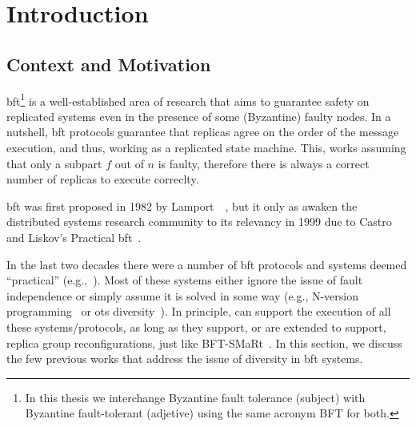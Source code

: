 \chapter{Introduction}
\label{chap:introduction}

\section{Context and Motivation}
\gls{bft}\footnote{In this thesis we interchange Byzantine fault tolerance (subject) with Byzantine fault-tolerant (adjetive) using the same acronym BFT for both.} is a well-established area of research that aims to guarantee safety on replicated systems even in the presence of some (Byzantine) faulty nodes.
In a nutshell, \gls{bft} protocols guarantee that replicas agree on the order of the message execution, and thus, working as a replicated state machine.
This, works assuming that only a subpart $f$ out of $n$ is faulty, therefore there is always a correct number of replicas to execute correclty.


\gls{bft} was first proposed in 1982 by Lamport~\etal{}~\cite{Lamport:1982}, but it only as awaken the distributed systems research community to its relevancy in 1999 due to Castro and Liskov's Practical \gls{bft}~\cite{Castro:1999}. 

In the last two decades there were a number of \gls{bft} protocols and systems deemed ``practical'' (e.g.,~\cite{Castro:2002,Kotla:2010,Veronese:2013,Aublin:2015,Behl:2015,Behl:2017,Liu:2016,Yin:2003}).
Most of these systems either ignore the issue of fault independence or simply assume it is solved in some way (e.g., N-version programming~\cite{Chen:1995} or \gls{ots} diversity~\cite{Gashi:2007,Garcia:2014}).
In principle, \system can support the execution of all these systems/protocols, as long as they support, or are extended to support, replica group reconfigurations, just like BFT-SMaRt~\cite{Bessani:2014}.
In this section, we discuss the few previous works that address the issue of diversity in \gls{bft} systems. 



